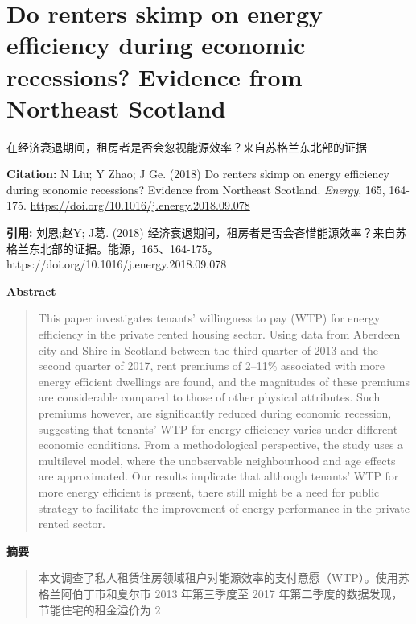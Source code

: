 \vspace{0.5em}


\chapter{Do renters skimp on energy efficiency during economic recessions? Evidence from Northeast Scotland}
\begin{center}\small 在经济衰退期间，租房者是否会忽视能源效率？来自苏格兰东北部的证据\end{center}

\noindent\textbf{Citation:} N Liu; Y Zhao; J Ge. (2018) Do renters skimp on energy efficiency during economic recessions? Evidence from Northeast Scotland. \textit{Energy}, 165, 164-175. \url{https://doi.org/10.1016/j.energy.2018.09.078}

\vspace{0.5em}
\noindent\textbf{引用:} 刘恩;赵Y; J葛. (2018) 经济衰退期间，租房者是否会吝惜能源效率？来自苏格兰东北部的证据。能源，165、164-175。 https://doi.org/10.1016/j.energy.2018.09.078

\vspace{1.5em}
\noindent\textbf{Abstract}\par
\begin{quote}\small
This paper investigates tenants' willingness to pay (WTP) for energy efficiency in the private rented housing sector. Using data from Aberdeen city and Shire in Scotland between the third quarter of 2013 and the second quarter of 2017, rent premiums of 2–11\% associated with more energy efficient dwellings are found, and the magnitudes of these premiums are considerable compared to those of other physical attributes. Such premiums however, are significantly reduced during economic recession, suggesting that tenants' WTP for energy efficiency varies under different economic conditions. From a methodological perspective, the study uses a multilevel model, where the unobservable neighbourhood and age effects are approximated. Our results implicate that although tenants’ WTP for more energy efficient is present, there still might be a need for public strategy to facilitate the improvement of energy performance in the private rented sector.
\end{quote}

\noindent\textbf{摘要}\par
\begin{quote}\small
本文调查了私人租赁住房领域租户对能源效率的支付意愿（WTP）。使用苏格兰阿伯丁市和夏尔市 2013 年第三季度至 2017 年第二季度的数据发现，节能住宅的租金溢价为 2%
\end{quote}

